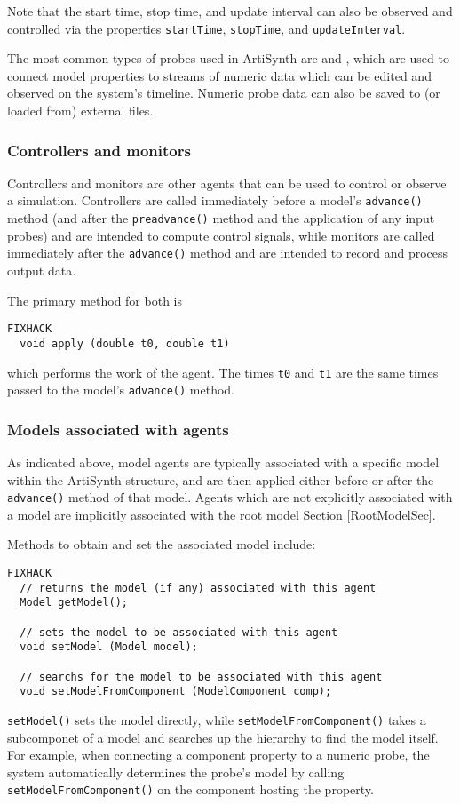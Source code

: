 \documentclass{article}
\begin{document}
Note that the start time, stop time, and update interval can also be
observed and controlled via the properties {\tt startTime}, {\tt stopTime},
and {\tt updateInterval}.

The most common types of probes used in ArtiSynth are
 and , which are
used to connect model properties to streams of numeric data which can
be edited and observed on the system's timeline. Numeric probe data
can also be saved to (or loaded from) external files.

\subsubsection{Controllers and monitors}

Controllers and monitors are other agents that can be used to control
or observe a simulation. Controllers are called immediately before a
model's {\tt advance()} method (and after the {\tt preadvance()}
method and the application of any input probes) and are intended to
compute control signals, while monitors are called immediately after
the {\tt advance()} method and are intended to record and process
output data.

The primary method for both is

\begin{lstlisting}FIXHACK
  void apply (double t0, double t1)
\end{lstlisting}

which performs the work of the agent. The times {\tt t0} and {\tt t1}
are the same times passed to the model's {\tt advance()} method.

\subsubsection{Models associated with agents}
\label{AssociatedModelsSec}

As indicated above, model agents are typically associated with a
specific model within the ArtiSynth structure, and are then applied
either before or after the {\tt advance()} method of that model.  Agents
which are not explicitly associated with a model are implicitly
associated with the root model Section \ref{RootModelSec}.

Methods to obtain and set the associated model include:
\begin{lstlisting}FIXHACK
  // returns the model (if any) associated with this agent
  Model getModel();

  // sets the model to be associated with this agent
  void setModel (Model model);

  // searchs for the model to be associated with this agent
  void setModelFromComponent (ModelComponent comp);
\end{lstlisting}
{\tt setModel()} sets the model directly, while {\tt setModelFromComponent()}
takes a subcomponet of a model and searches up the hierarchy to find
the model itself. For example, when connecting a component property to
a numeric probe, the system automatically determines the probe's model
by calling {\tt setModelFromComponent()} on the component hosting the
property.
\end{document}
